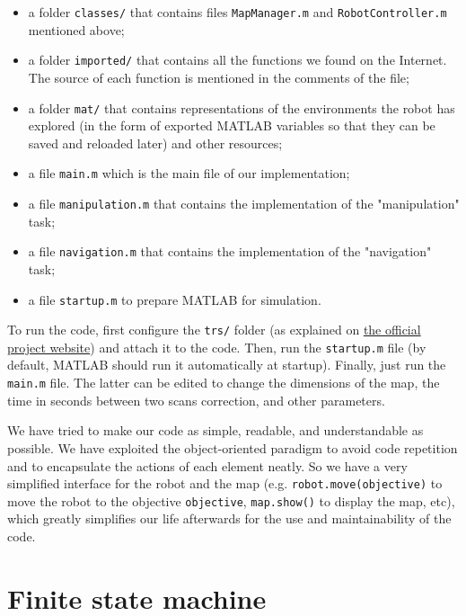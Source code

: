 \documentclass[a4paper, 10pt, conference]{ieeeconf}
\begin{document}
    \begin{itemize}
        \item a folder \texttt{classes/} that contains files \texttt{MapManager.m} and \texttt{RobotController.m} mentioned above;
        \item a folder \texttt{imported/} that contains all the functions we found on the Internet. The source of each function is mentioned in the comments of the file;
        \item a folder \texttt{mat/} that contains representations of the environments the robot has explored (in the form of exported MATLAB variables so that they can be saved and reloaded later) and other resources;
        \item a file \texttt{main.m} which is the main file of our implementation;
        \item a file \texttt{manipulation.m} that contains the implementation of the "manipulation" task;
        \item a file \texttt{navigation.m} that contains the implementation of the "navigation" task;
        \item a file \texttt{startup.m} to prepare MATLAB for simulation.
    \end{itemize}
    
    To run the code, first configure the \texttt{trs/} folder (as explained on \href{http://ulgrobotics.github.io/trs/setup.html#install}{the official project website}) and attach it to the code. Then, run the \texttt{startup.m} file (by default, MATLAB should run it automatically at startup). Finally, just run the \texttt{main.m} file. The latter can be edited to change the dimensions of the map, the time in seconds between two scans correction, and other parameters.
    
    We have tried to make our code as simple, readable, and understandable as possible. We have exploited the object-oriented paradigm to avoid code repetition and to encapsulate the actions of each element neatly. So we have a very simplified interface for the robot and the map (e.g. \texttt{robot.move(objective)} to move the robot to the objective \texttt{objective}, \texttt{map.show()} to display the map, etc), which greatly simplifies our life afterwards for the use and maintainability of the code.
    
    
    \section{Finite state machine}
    
\end{document}

